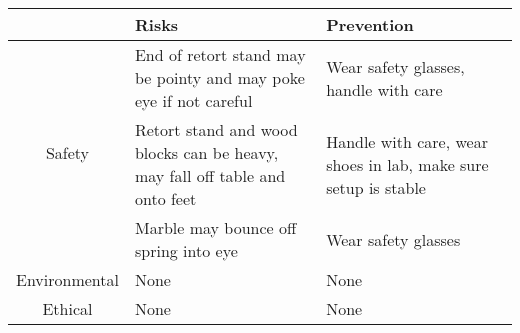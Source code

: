 \begin{center}
    \begin{tabular}{|c|p{5cm}|p{5cm}|} 
        \hline
        ~ & Risks & Prevention \\ 
        \hline
        \multirow{3}{4em}{Safety} & End of retort stand may be pointy and may poke eye if not careful & Wear safety glasses, handle with care \\ 
        \cline{2-3}
        & Retort stand and wood blocks can be heavy, may fall off table and onto feet & Handle with care, wear shoes in lab, make sure setup is stable \\
        \cline{2-3}
        & Marble may bounce off spring into eye & Wear safety glasses \\
        \hline
        Environmental & None & None \\
        \hline
        Ethical & None & None  \\ 
        \hline
    \end{tabular}
\end{center}